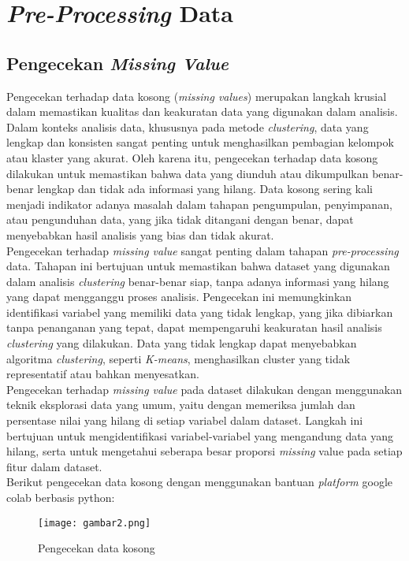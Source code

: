 \documentclass[english,12pt,a4paper,openany]{book}
\begin{document}
	\section{\textit{Pre-Processing} Data}
	\subsection{Pengecekan \textit{Missing Value}}
	Pengecekan terhadap data kosong (\textit{missing values}) merupakan langkah krusial dalam memastikan kualitas dan keakuratan data yang digunakan dalam analisis. Dalam konteks analisis data, khususnya pada metode \textit{clustering}, data yang lengkap dan konsisten sangat penting untuk menghasilkan pembagian kelompok atau klaster yang akurat. Oleh karena itu, pengecekan terhadap data kosong dilakukan untuk memastikan bahwa data yang diunduh atau dikumpulkan benar-benar lengkap dan tidak ada informasi yang hilang. Data kosong sering kali menjadi indikator adanya masalah dalam tahapan pengumpulan, penyimpanan, atau pengunduhan data, yang jika tidak ditangani dengan benar, dapat menyebabkan hasil analisis yang bias dan tidak akurat.\\
	
	Pengecekan terhadap \textit{missing value} sangat penting dalam tahapan \textit{pre-processing} data. Tahapan ini bertujuan untuk memastikan bahwa dataset yang digunakan dalam analisis \textit{clustering} benar-benar siap, tanpa adanya informasi yang hilang yang dapat mengganggu proses analisis. Pengecekan ini memungkinkan identifikasi variabel yang memiliki data yang tidak lengkap, yang jika dibiarkan tanpa penanganan yang tepat, dapat mempengaruhi keakuratan hasil analisis \textit{clustering} yang dilakukan. Data yang tidak lengkap dapat menyebabkan algoritma \textit{clustering}, seperti \textit{K-means}, menghasilkan cluster yang tidak representatif atau bahkan menyesatkan.\\
	
	Pengecekan terhadap \textit{missing value} pada dataset dilakukan dengan menggunakan teknik eksplorasi data yang umum, yaitu dengan memeriksa jumlah dan persentase nilai yang hilang di setiap variabel dalam dataset. Langkah ini bertujuan untuk mengidentifikasi variabel-variabel yang mengandung data yang hilang, serta untuk mengetahui seberapa besar proporsi \textit{missing }value pada setiap fitur dalam dataset.\\
	
	Berikut pengecekan data kosong dengan menggunakan bantuan \textit{platform} google colab berbasis python:\\
	\begin{figure}[H]
		\centering
		\texttt{[image: gambar2.png]}
		\caption{Pengecekan data kosong}
		\label{fig:enter-label}
	\end{figure}\\
	
\end{document}
